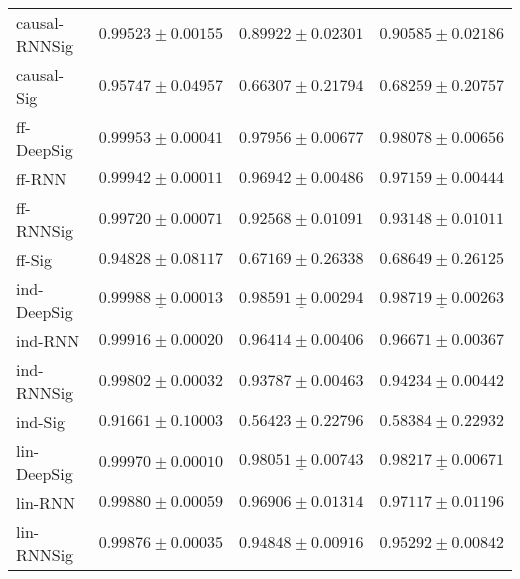 \begin{tabular}{llll}
causal-RNNSig  &                           $ 0.99523 \pm 0.00155 $ &                           $ 0.89922 \pm 0.02301 $ &                           $ 0.90585 \pm 0.02186 $ \\
causal-Sig     &                           $ 0.95747 \pm 0.04957 $ &                           $ 0.66307 \pm 0.21794 $ &                           $ 0.68259 \pm 0.20757 $ \\
ff-DeepSig     &                           $ 0.99953 \pm 0.00041 $ &                           $ 0.97956 \pm 0.00677 $ &                           $ 0.98078 \pm 0.00656 $ \\
ff-RNN         &                           $ 0.99942 \pm 0.00011 $ &                           $ 0.96942 \pm 0.00486 $ &                           $ 0.97159 \pm 0.00444 $ \\
ff-RNNSig      &                           $ 0.99720 \pm 0.00071 $ &                           $ 0.92568 \pm 0.01091 $ &                           $ 0.93148 \pm 0.01011 $ \\
ff-Sig         &                           $ 0.94828 \pm 0.08117 $ &                           $ 0.67169 \pm 0.26338 $ &                           $ 0.68649 \pm 0.26125 $ \\
ind-DeepSig    &  $  \mathbf{ \underline{ 0.99988 \pm 0.00013 }} $ &  $  \mathbf{ \underline{ 0.98591 \pm 0.00294 }} $ &  $  \mathbf{ \underline{ 0.98719 \pm 0.00263 }} $ \\
ind-RNN        &                           $ 0.99916 \pm 0.00020 $ &                           $ 0.96414 \pm 0.00406 $ &                           $ 0.96671 \pm 0.00367 $ \\
ind-RNNSig     &                           $ 0.99802 \pm 0.00032 $ &                           $ 0.93787 \pm 0.00463 $ &                           $ 0.94234 \pm 0.00442 $ \\
ind-Sig        &                           $ 0.91661 \pm 0.10003 $ &                           $ 0.56423 \pm 0.22796 $ &                           $ 0.58384 \pm 0.22932 $ \\
lin-DeepSig    &                           $ 0.99970 \pm 0.00010 $ &            $  \underline{ 0.98051 \pm 0.00743 } $ &            $  \underline{ 0.98217 \pm 0.00671 } $ \\
lin-RNN        &                           $ 0.99880 \pm 0.00059 $ &                           $ 0.96906 \pm 0.01314 $ &                           $ 0.97117 \pm 0.01196 $ \\
lin-RNNSig     &                           $ 0.99876 \pm 0.00035 $ &                           $ 0.94848 \pm 0.00916 $ &                           $ 0.95292 \pm 0.00842 $ \\

\end{tabular}
